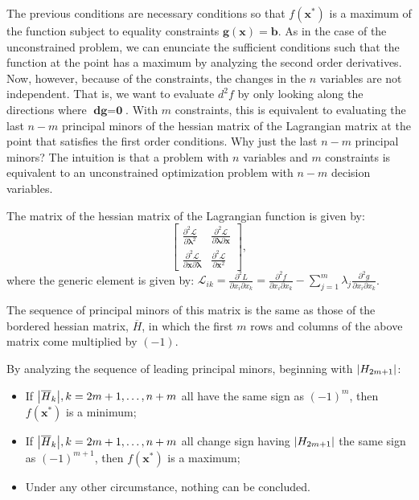 \documentclass[0pt, a4paper]{article}
\newcommand{\Lagr}{\mathcal{L}}
\begin{document}
The previous conditions are necessary conditions so that $f(\textbf{x}^*)$ is a maximum of the function subject to equality constraints $\textbf{g}(\textbf{x})=\textbf{b}$. As in the case of the unconstrained problem, we can enunciate the sufficient conditions such that the function at the point has a maximum by analyzing the second order derivatives. Now, however, because of the constraints, the changes in the $n$ variables are not independent. That is, we want to evaluate $d^2f$ by only looking along the directions where $\textbf{dg}=\textbf{0}$. With $m$ constraints, this is equivalent to evaluating the last $n-m$ principal minors of the hessian matrix of the Lagrangian matrix at the point that satisfies the first order conditions. Why just the last $n-m$ principal minors? The intuition is that a problem with $n$ variables and $m$ constraints is equivalent to an unconstrained optimization problem with $n-m$ decision variables.

The matrix of the hessian matrix of the Lagrangian function is given by:
$$
\begin{bmatrix}
\frac{\partial^2 \Lagr}{\partial\boldsymbol{\lambda}^2} & \frac{\partial^2 \Lagr}{\partial\boldsymbol{\lambda}\partial\textbf{x}}\\ 
\frac{\partial^2 \Lagr}{\partial\textbf{x}\partial\boldsymbol{\lambda}} &  \frac{\partial^2 \Lagr}{\partial\textbf{x}^2}
\end{bmatrix},
$$
where the generic element is given by: $\Lagr_{ik}=\frac{\partial^2 L}{\partial x_i\partial x_k}=\frac{\partial^2 f}{\partial x_i \partial x_k}-\sum_{j=1}^m\lambda_j\frac{\partial^2g}{\partial x_i \partial x_k}$.

The sequence of principal minors of this matrix is the same as those of the bordered hessian matrix, $\overline{H}$, in which the first $m$ rows and columns of the above matrix come multiplied by $(-1)$.

By analyzing the sequence of leading principal minors, beginning with $\abs{H_{2m+1}}$:
\begin{itemize}
	\item If $\abs{\overline{H}_k}, k=2m+1,\dots,n+m$ all have the same sign as $(-1)^m$, then $f(\textbf{x}^*)$ is a minimum;
	\item If $\abs{\overline{H}_k}, k=2m+1,\dots,n+m$ all change sign having $\abs{H_{2m+1}}$ the same sign as $(-1)^{m+1}$, then $f(\textbf{x}^*)$ is a maximum;
	\item Under any other circumstance, nothing can be concluded.
\end{itemize}
\end{document}
